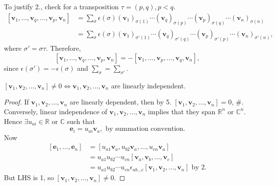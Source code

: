 \documentclass[a4paper]{article}
\begin{document}
    To justify 2., check for a transposition $ \tau=(p,q), p<q$.
    \[
      \begin{aligned}
        [\mathbf{v}_1,\dots,\mathbf{v}_q,\dots,\mathbf{v}_p,\mathbf{v}_{n}]&=\sum_{\sigma}\epsilon(\sigma)(\mathbf{v}_1)_{\sigma(1)}\cdots
        (\mathbf{v}_q)_{\sigma(p)}\cdots(\mathbf{v}_p)_{\sigma(q)}\cdots
        (\mathbf{v}_n)_{\sigma(n)}\\
        &=\sum_{\sigma}\epsilon(\sigma)(\mathbf{v}_1)_{\sigma'(1)}\cdots
        (\mathbf{v}_q)_{\sigma'(q)}\cdots(\mathbf{v}_p)_{\sigma'(p)}\cdots
        (\mathbf{v}_n)_{\sigma'(n)},
      \end{aligned}
    \]
    where $ \sigma'=\sigma \tau $. Therefore,
    \[
      [\mathbf{v}_1,\dots,\mathbf{v}_q,\dots,\mathbf{v}_p,\mathbf{v}_{n}]
      = -[\mathbf{v}_1,\dots,\mathbf{v}_p,\dots,\mathbf{v}_q,\mathbf{v}_{n}]
    ,\]
    since $ \epsilon(\sigma')=-\epsilon(\sigma) $ and $
    \sum_{\sigma}=\sum_{\sigma'} $.
    \begin{proposition}
      $ [\mathbf{v}_1,\mathbf{v}_2,\dots,\mathbf{v}_n]\neq 0
      \Leftrightarrow \mathbf{v}_1,\mathbf{v}_2,\dots,\mathbf{v}_n $
      are linearly independent.
    \end{proposition}
    \begin{proof}
      If $ \mathbf{v}_1,\mathbf{v}_2,\dots,\mathbf{v}_n $ are
      linearly dependent, then by 5. $
      [\mathbf{v}_1,\mathbf{v}_2,\dots,\mathbf{v}_n]=0 $, \#.
      Conversely, linear independence of $
      \mathbf{v}_1,\mathbf{v}_2,\dots,\mathbf{v}_n $ implies that
      they span $ \mathbb{R}^{n} $ or $ \mathbb{C}^{n} $. Hence $
      \exists u_{ai}\in \mathbb{R} \text{ or }\mathbb{C}  $ such that
      \[
        \mathbf{e}_i = u_{ai}\mathbf{v}_a,\text{ by summation convention}
      .\]
      Now
      \[
        \begin{aligned}
          [\mathbf{e}_1,\dots,\mathbf{e}_n]&=[u_{a1}\mathbf{v}_a,u_{b2}\mathbf{v}_a,\dots,
          u_{cn}\mathbf{v}_a]\\
          &= u_{a1}u_{b2}\cdots
          u_{cn}[\mathbf{v}_a,\mathbf{v}_b,\dots,\mathbf{v}_c]\\
          &=u_{a1}u_{b2}\cdots u_{cn} \epsilon_{ab\dots c}
          [\mathbf{v}_1,\mathbf{v}_2,\dots,\mathbf{v}_n]\text{ by 2.}
        \end{aligned}
      \]
      But LHS is 1, so $ [\mathbf{v}_1,\mathbf{v}_2,\dots,\mathbf{v}_n]\neq 0 $.
    \end{proof}
\end{document}
